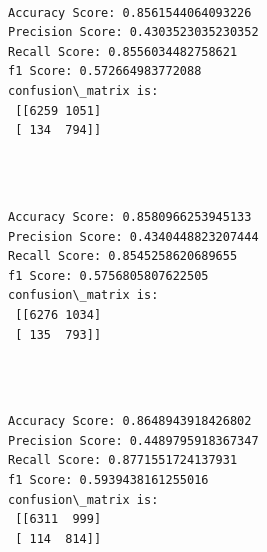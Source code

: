 \documentclass[11pt]{article}
\begin{document}
    \begin{center}
    \end{center}
    { \hspace*{\fill} \\}
    
    \begin{Verbatim}[commandchars=\\\{\}]
Accuracy Score: 0.8561544064093226
Precision Score: 0.4303523035230352
Recall Score: 0.8556034482758621
f1 Score: 0.572664983772088
confusion\_matrix is: 
 [[6259 1051]
 [ 134  794]] 


    \end{Verbatim}

   

    \begin{center}
    \end{center}
    { \hspace*{\fill} \\}
    
    \begin{Verbatim}[commandchars=\\\{\}]
Accuracy Score: 0.8580966253945133
Precision Score: 0.4340448823207444
Recall Score: 0.8545258620689655
f1 Score: 0.5756805807622505
confusion\_matrix is: 
 [[6276 1034]
 [ 135  793]] 


    \end{Verbatim}

    

    \begin{center}
    \end{center}
    { \hspace*{\fill} \\}
    
    \begin{Verbatim}[commandchars=\\\{\}]
Accuracy Score: 0.8648943918426802
Precision Score: 0.4489795918367347
Recall Score: 0.8771551724137931
f1 Score: 0.5939438161255016
confusion\_matrix is: 
 [[6311  999]
 [ 114  814]] 


    \end{Verbatim}

   

    \begin{center}
    \end{center}
    { \hspace*{\fill} \\}
    
\end{document}
